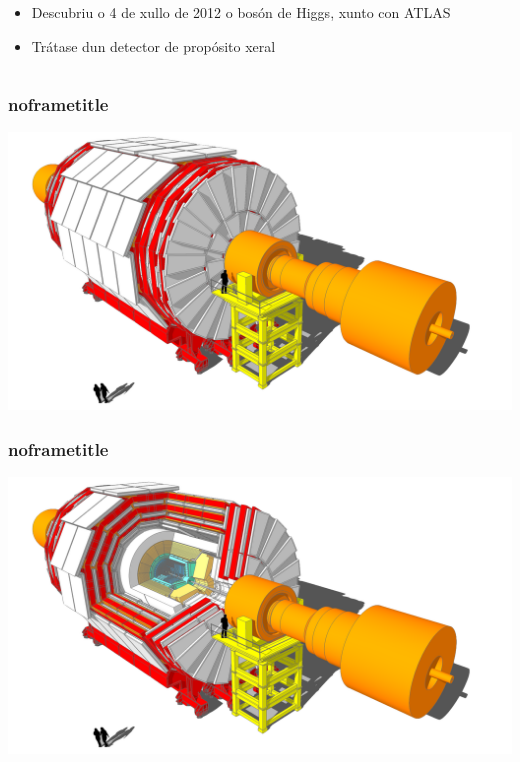\documentclass{beamer}
\begin{document}
\begin{frame}
\begin{columns}[T]
\begin{column}{0.55\textwidth}
    \bigskip 

    \begin{itemize}
    \item Descubriu o 4 de xullo de 2012 o bosón de Higgs, xunto con ATLAS
    \item Trátase dun detector de propósito xeral
    \end{itemize}
  \end{column}

\end{columns}

\end{frame}



\begin{frame}
\frametitle{noframetitle}
\includegraphics[width=\textwidth]{gpx/cms_3d_close.png}
\end{frame}



\addtocounter{framenumber}{-1}



\begin{frame}
\frametitle{noframetitle}
\includegraphics[width=\textwidth]{gpx/cms_3d_open.png}
\end{frame}
\end{document}
